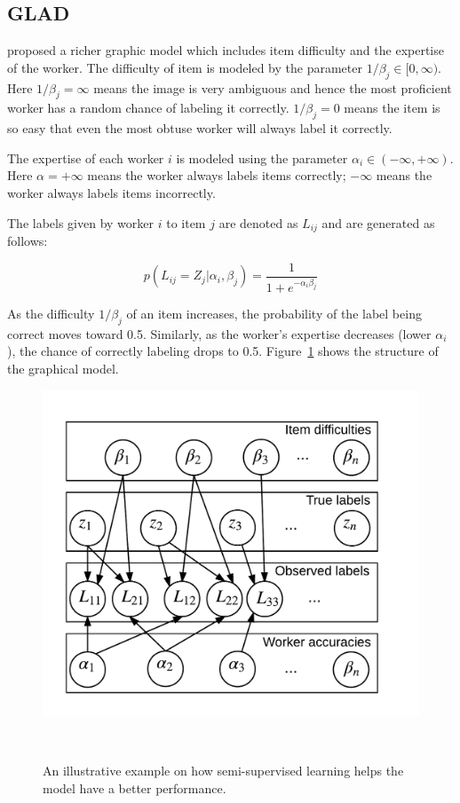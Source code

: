 \documentclass{article}
\begin{document}
\subsection{GLAD}
\cite{NIPS2009_3644} proposed a richer graphic model which includes
item difficulty and the expertise of the worker. The difficulty of
item is modeled by the parameter $1/\beta_j \in [0,\infty)$. Here $1/\beta_j = \infty$
means the image is very ambiguous and hence the most proficient worker
has a random chance of labeling it correctly. $1/\beta_j = 0$ means the item is
so easy that even the most obtuse worker will always label it correctly.

The expertise of each worker $i$ is modeled using the parameter
$\alpha_i \in (-\infty, +\infty)$. Here $\alpha = +\infty$ means the
worker always labels items correctly; $-\infty$ means the worker
always labels items incorrectly.

The labels given by worker $i$ to item $j$ are denoted as $L_{ij}$
and are generated as follows:

\begin{equation} \label{eq:glad_label}
  p(L_{ij}=Z_j|\alpha_i , \beta_j) = \frac{1}{1+e^{-\alpha_i \beta_j}}
\end{equation}

As the difficulty $1/\beta_j$ of an item increases, the probability of
the label being correct moves toward 0.5. Similarly, as the worker's
expertise decreases (lower $\alpha_i$), the chance of correctly
labeling drops to 0.5. Figure~\ref{fg:glad_model} shows the structure
of the graphical model.

\begin{figure}[h]
  \centering
  \includegraphics[width=0.95\columnwidth]{glad.png}
  \caption{An illustrative example on how semi-supervised learning helps
    the model have a better performance.}~\label{fg:glad_model}
\end{figure}
\end{document}
